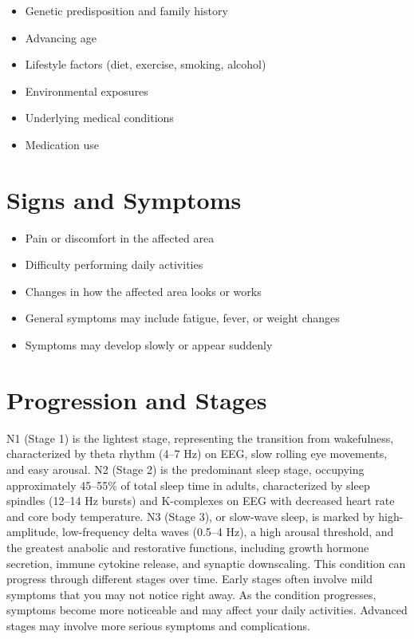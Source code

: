\begin{itemize}[noitemsep]
  \item Genetic predisposition and family history
  \item Advancing age
  \item Lifestyle factors (diet, exercise, smoking, alcohol)
  \item Environmental exposures
  \item Underlying medical conditions
  \item Medication use
\end{itemize}

\section{Signs and Symptoms}

\begin{itemize}[noitemsep]
  \item Pain or discomfort in the affected area
  \item Difficulty performing daily activities
  \item Changes in how the affected area looks or works
  \item General symptoms may include fatigue, fever, or weight changes
  \item Symptoms may develop slowly or appear suddenly
\end{itemize}

\section{Progression and Stages}
N1 (Stage 1) is the lightest stage, representing the transition from wakefulness, characterized by theta rhythm (4--7 Hz) on EEG, slow rolling eye movements, and easy arousal. N2 (Stage 2) is the predominant sleep stage, occupying approximately 45--55\% of total sleep time in adults, characterized by sleep spindles (12--14 Hz bursts) and K-complexes on EEG with decreased heart rate and core body temperature. N3 (Stage 3), or slow-wave sleep, is marked by high-amplitude, low-frequency delta waves (0.5--4 Hz), a high arousal threshold, and the greatest anabolic and restorative functions, including growth hormone secretion, immune cytokine release, and synaptic downscaling. This condition can progress through different stages over time. Early stages often involve mild symptoms that you may not notice right away. As the condition progresses, symptoms become more noticeable and may affect your daily activities. Advanced stages may involve more serious symptoms and complications.

